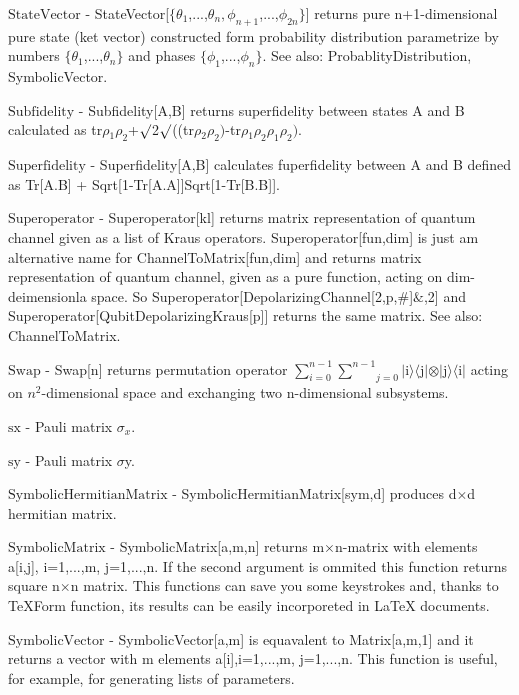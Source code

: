\documentclass[a4paper,12pt]{article}
\begin{document}
\textbf{$ \text{StateVector} $ } - StateVector[$\{$$ \theta _1 $,...,$ \theta _n,\phi _{n+1} $,...,$ \phi _{2 n} $$\}$] returns pure n+1-dimensional pure state (ket vector) constructed form probability distribution parametrize by numbers $\{$$ \theta _1 $,...,$ \theta _n $$\}$ and phases $\{$$ \phi _1 $,...,$ \phi _n $$\}$. See also: ProbablityDistribution, SymbolicVector.$  $

\textbf{$ \text{Subfidelity} $ } - Subfidelity[A,B] returns superfidelity between states A and B calculated as $  $tr$\rho $$ _1\rho _2 $+$\surd $2$\surd $(($  $tr$\rho $$ _2\rho _2\text{)-} $tr$\rho $$ _1\rho _2\rho _1\rho _2\text{).} $

\textbf{$ \text{Superfidelity} $ } - Superfidelity[A,B] calculates fuperfidelity between A and B defined as Tr[A.B] + Sqrt[1-Tr[A.A]]Sqrt[1-Tr[B.B]].$  $

\textbf{$ \text{Superoperator} $ } - Superoperator[kl] returns matrix representation of quantum channel given as a list of Kraus operators. Superoperator[fun,dim] is just am alternative name for ChannelToMatrix[fun,dim] and returns matrix representation of quantum channel, given as a pure function, acting on dim-deimensionla space. So Superoperator[DepolarizingChannel[2,p,$\#$]$\&$,2] and Superoperator[QubitDepolarizingKraus[p]] returns the same matrix. See also: ChannelToMatrix.$  $

\textbf{$ \text{Swap} $ } - Swap[n] returns permutation operator $ \sum _{i=0}^{n-1} \underset{j=0}{\overset{n-1}{ \sum }} $$|$i$\rangle \langle $j$|\otimes |$j$\rangle \langle $i$|$ acting on $ n^2 $-dimensional space and exchanging two n-dimensional subsystems.$  $

\textbf{$ \text{sx} $ } - Pauli matrix $ \sigma _x. $

\textbf{$ \text{sy} $ } - Pauli matrix $\sigma $y.$  $

\textbf{$ \text{SymbolicHermitianMatrix} $ } - SymbolicHermitianMatrix[sym,d] produces d$\times $d hermitian matrix.$  $

\textbf{$ \text{SymbolicMatrix} $ } - SymbolicMatrix[a,m,n] returns m$\times $n-matrix with elements a[i,j], i=1,...,m, j=1,...,n. If the second argument is ommited this function returns square n$\times $n matrix. This functions can save you some keystrokes and, thanks to TeXForm function, its results can be easily incorporeted in LaTeX documents.$  $

\textbf{$ \text{SymbolicVector} $ } - SymbolicVector[a,m] is equavalent to Matrix[a,m,1] and it returns a vector with m elements a[i],i=1,...,m, j=1,...,n. This function is useful, for example, for generating lists of parameters.$  $
\end{document}
